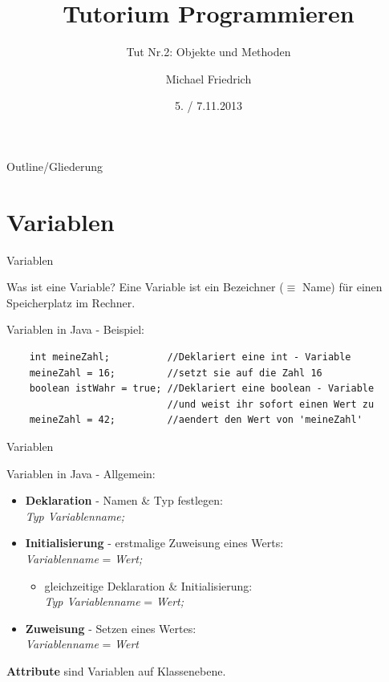 \documentclass[18pt]{beamer}
\title[Prog Tut Nr. 2]{Tutorium Programmieren}
\subtitle{Tut Nr.2: Objekte und Methoden}
\author{Michael Friedrich}
\date{5. / 7.11.2013}
\institute{Institut f\"ur theoretische Informatik}
\begin{document}

\begin{frame}
	\titlepage
\end{frame}

\begin{frame}{Outline/Gliederung}
	\tableofcontents
\end{frame}


\section{Variablen}

\begin{frame}[fragile]{Variablen}
\begin{block}{Was ist eine Variable?}
Eine Variable ist ein Bezeichner ($\equiv$ Name) für einen Speicherplatz im Rechner.
\end{block}
\pause
\begin{exampleblock}{Variablen in Java - Beispiel:}
	\begin{lstlisting}
	int meineZahl;			//Deklariert eine int - Variable
	meineZahl = 16;			//setzt sie auf die Zahl 16
	boolean istWahr = true;	//Deklariert eine boolean - Variable 
							//und weist ihr sofort einen Wert zu
	meineZahl = 42;			//aendert den Wert von 'meineZahl'
	\end{lstlisting}
	\end{exampleblock}
\end{frame}

\begin{frame}{Variablen}
\begin{block}{Variablen in Java - Allgemein:}
\begin{itemize}
	\item \textbf{Deklaration} - Namen \& Typ festlegen:\\
	\textit{Typ Variablenname;}
	\item \textbf{Initialisierung} - erstmalige Zuweisung eines Werts:\\
	\textit{Variablenname} = \textit{Wert;}\\
	\begin{itemize}
		\item gleichzeitige Deklaration \& Initialisierung:\\
		\textit{Typ Variablenname} = \textit{Wert;}
	\end{itemize}
	\item \textbf{Zuweisung} - Setzen eines Wertes:\\
	\textit{Variablenname} = \textit{Wert}
\end{itemize}
\end{block}
\pause
\textbf{Attribute} sind Variablen auf Klassenebene.
\end{frame}
\end{document}
